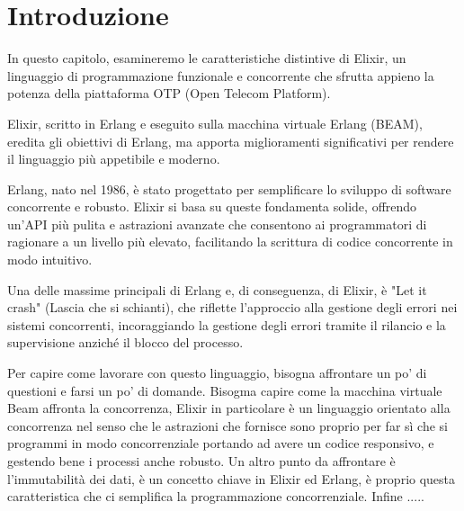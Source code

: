 \section{Introduzione}



In questo capitolo, esamineremo le caratteristiche distintive
di Elixir, un linguaggio di programmazione funzionale e
concorrente che sfrutta appieno la potenza della piattaforma
OTP (Open Telecom Platform).

Elixir, scritto in Erlang e eseguito sulla macchina virtuale
Erlang (BEAM), eredita gli obiettivi di Erlang, ma apporta
miglioramenti significativi per rendere il linguaggio più
appetibile e moderno.

Erlang, nato nel 1986, è stato progettato per semplificare
lo sviluppo di software concorrente e robusto.
Elixir si basa su queste fondamenta solide, offrendo un'API
più pulita e astrazioni avanzate che consentono ai programmatori
di ragionare a un livello più elevato, facilitando la scrittura
di codice concorrente in modo intuitivo.

Una delle massime principali di Erlang e, di conseguenza,
di Elixir, è "Let it crash" (Lascia che si schianti),
che riflette l'approccio alla gestione degli errori nei sistemi
concorrenti, incoraggiando la gestione degli errori tramite
il rilancio e la supervisione anziché il blocco del processo.

Per capire come lavorare con questo linguaggio, bisogna affrontare
un po' di questioni e farsi un po' di domande.
Bisogma capire come la macchina virtuale Beam affronta la concorrenza,
Elixir in particolare è un linguaggio orientato alla concorrenza nel
senso che le astrazioni che fornisce sono proprio per far sì che
si programmi in modo concorrenziale portando ad avere un
codice responsivo, e gestendo bene i processi anche robusto.
Un altro punto da affrontare è l'immutabilità dei dati, è un concetto
chiave in Elixir ed Erlang, è proprio questa caratteristica
che ci semplifica la programmazione concorrenziale.
Infine .....